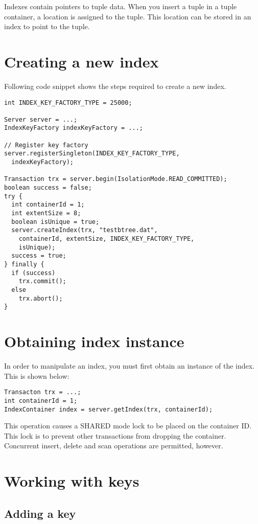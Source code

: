 \documentclass[a4paper,draft,oneside]{book}
\begin{document}
Indexes contain pointers to tuple data. When you insert a tuple in a
tuple container, a location is assigned to the tuple. This location
can be stored in an index to point to the tuple.

\section{Creating a new index}

Following code snippet shows the steps required to create a new
index.

\begin{verbatim}
int INDEX_KEY_FACTORY_TYPE = 25000;

Server server = ...;
IndexKeyFactory indexKeyFactory = ...;

// Register key factory
server.registerSingleton(INDEX_KEY_FACTORY_TYPE, 
  indexKeyFactory);

Transaction trx = server.begin(IsolationMode.READ_COMMITTED);
boolean success = false;
try {
  int containerId = 1;
  int extentSize = 8;
  boolean isUnique = true;
  server.createIndex(trx, "testbtree.dat", 
    containerId, extentSize, INDEX_KEY_FACTORY_TYPE, 
    isUnique);
  success = true;
} finally {
  if (success)
    trx.commit();
  else
    trx.abort();
}
\end{verbatim}

\section{Obtaining index instance}

In order to manipulate an index, you must first obtain an instance of
the index. This is shown below:

\begin{verbatim}
Transacton trx = ...;
int containerId = 1;
IndexContainer index = server.getIndex(trx, containerId);
\end{verbatim}

This operation causes a SHARED mode lock to be placed on the container
ID. This lock is to prevent other transactions from dropping the
container. Concurrent insert, delete and scan operations are
permitted, however.

\section{Working with keys}

\subsection{Adding a key}
\end{document}
